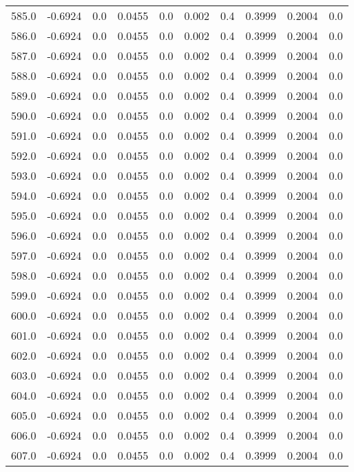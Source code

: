 \begin{longtable}{lrrrrrrrrr}
585.0 & -0.6924 & 0.0 & 0.0455 & 0.0 & 0.002 & 0.4 & 0.3999 & 0.2004 & 0.0 \\
586.0 & -0.6924 & 0.0 & 0.0455 & 0.0 & 0.002 & 0.4 & 0.3999 & 0.2004 & 0.0 \\
587.0 & -0.6924 & 0.0 & 0.0455 & 0.0 & 0.002 & 0.4 & 0.3999 & 0.2004 & 0.0 \\
588.0 & -0.6924 & 0.0 & 0.0455 & 0.0 & 0.002 & 0.4 & 0.3999 & 0.2004 & 0.0 \\
589.0 & -0.6924 & 0.0 & 0.0455 & 0.0 & 0.002 & 0.4 & 0.3999 & 0.2004 & 0.0 \\
590.0 & -0.6924 & 0.0 & 0.0455 & 0.0 & 0.002 & 0.4 & 0.3999 & 0.2004 & 0.0 \\
591.0 & -0.6924 & 0.0 & 0.0455 & 0.0 & 0.002 & 0.4 & 0.3999 & 0.2004 & 0.0 \\
592.0 & -0.6924 & 0.0 & 0.0455 & 0.0 & 0.002 & 0.4 & 0.3999 & 0.2004 & 0.0 \\
593.0 & -0.6924 & 0.0 & 0.0455 & 0.0 & 0.002 & 0.4 & 0.3999 & 0.2004 & 0.0 \\
594.0 & -0.6924 & 0.0 & 0.0455 & 0.0 & 0.002 & 0.4 & 0.3999 & 0.2004 & 0.0 \\
595.0 & -0.6924 & 0.0 & 0.0455 & 0.0 & 0.002 & 0.4 & 0.3999 & 0.2004 & 0.0 \\
596.0 & -0.6924 & 0.0 & 0.0455 & 0.0 & 0.002 & 0.4 & 0.3999 & 0.2004 & 0.0 \\
597.0 & -0.6924 & 0.0 & 0.0455 & 0.0 & 0.002 & 0.4 & 0.3999 & 0.2004 & 0.0 \\
598.0 & -0.6924 & 0.0 & 0.0455 & 0.0 & 0.002 & 0.4 & 0.3999 & 0.2004 & 0.0 \\
599.0 & -0.6924 & 0.0 & 0.0455 & 0.0 & 0.002 & 0.4 & 0.3999 & 0.2004 & 0.0 \\
600.0 & -0.6924 & 0.0 & 0.0455 & 0.0 & 0.002 & 0.4 & 0.3999 & 0.2004 & 0.0 \\
601.0 & -0.6924 & 0.0 & 0.0455 & 0.0 & 0.002 & 0.4 & 0.3999 & 0.2004 & 0.0 \\
602.0 & -0.6924 & 0.0 & 0.0455 & 0.0 & 0.002 & 0.4 & 0.3999 & 0.2004 & 0.0 \\
603.0 & -0.6924 & 0.0 & 0.0455 & 0.0 & 0.002 & 0.4 & 0.3999 & 0.2004 & 0.0 \\
604.0 & -0.6924 & 0.0 & 0.0455 & 0.0 & 0.002 & 0.4 & 0.3999 & 0.2004 & 0.0 \\
605.0 & -0.6924 & 0.0 & 0.0455 & 0.0 & 0.002 & 0.4 & 0.3999 & 0.2004 & 0.0 \\
606.0 & -0.6924 & 0.0 & 0.0455 & 0.0 & 0.002 & 0.4 & 0.3999 & 0.2004 & 0.0 \\
607.0 & -0.6924 & 0.0 & 0.0455 & 0.0 & 0.002 & 0.4 & 0.3999 & 0.2004 & 0.0 \\

\end{longtable}
